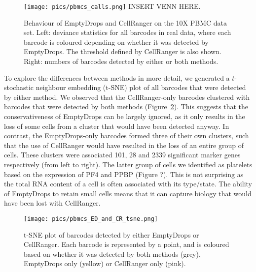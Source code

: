 \documentclass[10pt,letterpaper]{article}
\begin{document}
\begin{figure}[bt]
    \begin{center}
        \texttt{[image: pics/pbmcs\_calls.png]}
        INSERT VENN HERE.
    \end{center}
    \caption{Behaviour of EmptyDrops and CellRanger on the 10X PBMC data set.
        Left: deviance statistics for all barcodes in real data, where each barcode is coloured depending on whether it was detected by EmptyDrops.
        The threshold defined by CellRanger is also shown.
        Right: numbers of barcodes detected by either or both methods.
    }
    \label{fig:realcall}
\end{figure}

To explore the differences between methods in more detail, we generated a $t$-stochastic neighbour embedding (t-SNE) plot \cite{van2008visualizing} of all barcodes that were detected by either method.
We observed that the CellRanger-only barcodes clustered with barcodes that were detected by both methods (Figure~\ref{fig:realtsne}).
This suggests that the conservativeness of EmptyDrops can be largely ignored, as it only results in the loss of some cells from a cluster that would have been detected anyway.
In contrast, the EmptyDrops-only barcodes formed three of their own clusters, such that the use of CellRanger would have resulted in the loss of an entire group of cells. These clusters were associated 101, 28 and 2339 significant marker genes respectively (from left to right). The latter group of cells we identified as platelets based on the expression of PF4 and PPBP (Figure ?). 
This is not surprising as the total RNA content of a cell is often associated with its type/state.
The ability of EmptyDrops to retain small cells means that it can capture biology that would have been lost with CellRanger.

\begin{figure}
    \begin{center}
    \texttt{[image: pics/pbmcs\_ED\_and\_CR\_tsne.png]}
    \end{center}
    \caption{t-SNE plot of barcodes detected by either EmptyDrops or CellRanger.
        Each barcode is represented by a point, and is coloured based on whether it was detected by both methods (grey), EmptyDrops only (yellow) or CellRanger only (pink).
    } 
    \label{fig:realtsne}
\end{figure}
\end{document}
